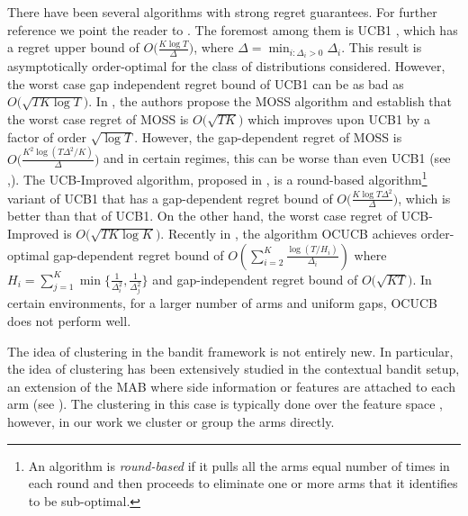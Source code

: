 	There have been several algorithms with strong regret guarantees. For further reference we point the reader to \citet{bubeck2012bandits}. The foremost among them is UCB1 \cite{auer2002finite}, which has a regret upper bound of $O\big(\frac{K\log T}{\Delta}\big)$, where $\Delta = \min_{i:\Delta_i>0} \Delta_i$. This result is asymptotically order-optimal for the class of distributions considered. However, the worst case gap independent regret bound of UCB1  can be as bad as $O \big(\sqrt{TK\log T}\big)$.  In \citet{audibert2009minimax}, the authors propose the MOSS algorithm and establish that the worst case regret of MOSS is $O\big(\sqrt{TK}\big)$ which improves upon UCB1 by a factor of order $\sqrt{\log T}$. However, the gap-dependent regret of MOSS is  $O\big(\frac{K^{2}\log\left(T\Delta^{2}/K\right)}{\Delta}\big)$ and in certain regimes, this can be worse than even UCB1 (see \cite{audibert2009minimax},\cite{lattimore2015optimally}). The UCB-Improved algorithm, proposed in \citet{auer2010ucb}, is a round-based algorithm\footnote{An algorithm is \textit{round-based} if it pulls all the arms equal number of times in each round and then proceeds to eliminate one or more arms that it identifies to be sub-optimal.} variant of UCB1 that 
has a gap-dependent regret bound of $O\big(\frac{K\log T\Delta^{2}}{\Delta}\big)$, which is better than that of UCB1. On the other hand, the worst case regret of UCB-Improved is $O\big(\sqrt{TK\log K}\big)$. Recently in \citet{lattimore2015optimally}, the algorithm OCUCB achieves order-optimal gap-dependent regret bound of $O\left(\sum_{i=2}^{K}\frac{\log\left(T/H_i\right)}{\Delta_i}\right)$ where $H_i=\sum_{j=1}^{K}\min\lbrace \frac{1}{\Delta_i^2},\frac{1}{\Delta_j^2}\rbrace$ and gap-independent regret bound of $O\big( \sqrt{KT}\big)$. In certain environments, for a larger number of arms and uniform gaps, OCUCB does  not perform well.

The idea of clustering in the bandit framework is not entirely new. In particular, the idea of clustering has been extensively studied in the contextual bandit setup, an extension of the MAB where side information or features are attached to each arm (see  \citet{auer2002using,langford2008epoch,li2010contextual,beygelzimer2011contextual, slivkins2014contextual}). The clustering in this case is typically done over the feature space \cite{bui2012clustered,cesa2013gang,gentile2014online}, however, in our work we cluster or group the arms directly.  
\vspace*{-0.7em}
